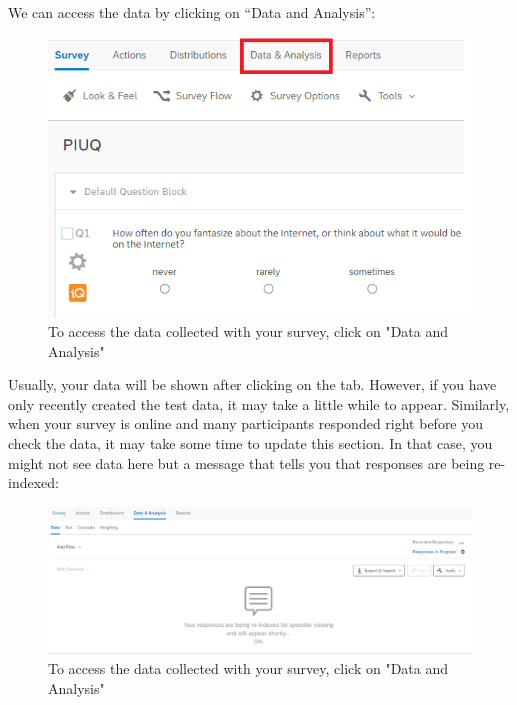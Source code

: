 \documentclass[
]{book}
\begin{document}
We can access the data by clicking on ``Data and Analysis'':

\begin{figure}

{\centering \includegraphics[width=0.85\linewidth]{images/Qualtrics/12checkdata1} 

}

\caption{To access the data collected with your survey, click on "Data and Analysis"}\label{fig:Figure11-11}
\end{figure}

Usually, your data will be shown after clicking on the tab. However, if you have only recently created the test data, it may take a little while to appear. Similarly, when your survey is online and many participants responded right before you check the data, it may take some time to update this section. In that case, you might not see data here but a message that tells you that responses are being re-indexed:

\begin{figure}

{\centering \includegraphics[width=0.85\linewidth]{images/Qualtrics/13checkdata2} 

}

\caption{To access the data collected with your survey, click on "Data and Analysis"}\label{fig:Figure11-12}
\end{figure}
\end{document}

